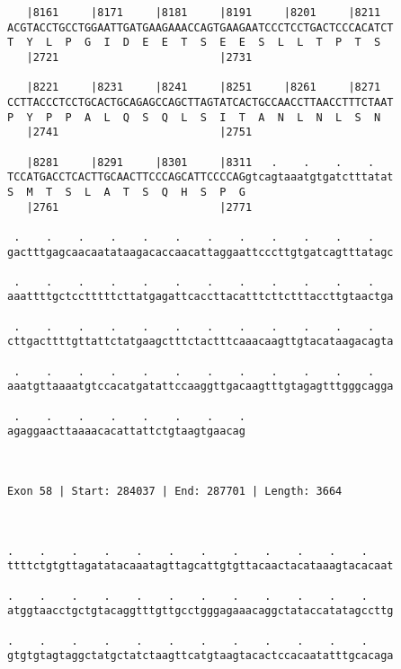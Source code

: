 \documentclass{article}
\begin{document}
\begin{Verbatim}
   |8161     |8171     |8181     |8191     |8201     |8211  
ACGTACCTGCCTGGAATTGATGAAGAAACCAGTGAAGAATCCCTCCTGACTCCCACATCT
T  Y  L  P  G  I  D  E  E  T  S  E  E  S  L  L  T  P  T  S  
   |2721                         |2731                      
  
   |8221     |8231     |8241     |8251     |8261     |8271  
CCTTACCCTCCTGCACTGCAGAGCCAGCTTAGTATCACTGCCAACCTTAACCTTTCTAAT
P  Y  P  P  A  L  Q  S  Q  L  S  I  T  A  N  L  N  L  S  N  
   |2741                         |2751                      
  
   |8281     |8291     |8301     |8311   .    .    .    .   
TCCATGACCTCACTTGCAACTTCCCAGCATTCCCCAGgtcagtaaatgtgatctttatat
S  M  T  S  L  A  T  S  Q  H  S  P  G                       
   |2761                         |2771                      
  
 .    .    .    .    .    .    .    .    .    .    .    .   
gactttgagcaacaatataagacaccaacattaggaattcccttgtgatcagtttatagc
                                                            
 .    .    .    .    .    .    .    .    .    .    .    .   
aaattttgctcctttttcttatgagattcaccttacatttcttctttaccttgtaactga
                                                            
 .    .    .    .    .    .    .    .    .    .    .    .   
cttgacttttgttattctatgaagctttctactttcaaacaagttgtacataagacagta
                                                            
 .    .    .    .    .    .    .    .    .    .    .    .   
aaatgttaaaatgtccacatgatattccaaggttgacaagtttgtagagtttgggcagga
                                                            
 .    .    .    .    .    .    .    .
agaggaacttaaaacacattattctgtaagtgaacag
                                     
                                     
 
Exon 58 | Start: 284037 | End: 287701 | Length: 3664



.    .    .    .    .    .    .    .    .    .    .    .    
ttttctgtgttagatatacaaatagttagcattgtgttacaactacataaagtacacaat
                                                            
.    .    .    .    .    .    .    .    .    .    .    .    
atggtaacctgctgtacaggtttgttgcctgggagaaacaggctataccatatagccttg
                                                            
.    .    .    .    .    .    .    .    .    .    .    .    
gtgtgtagtaggctatgctatctaagttcatgtaagtacactccacaatatttgcacaga
                                                            

\end{Verbatim}
\end{document}
